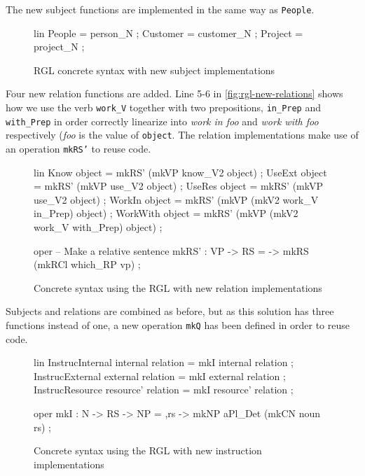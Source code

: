 The new subject functions are implemented in the same way as \texttt{People}.

\begin{figure}[H]
\begin{code}
lin
  People = person_N ;
  Customer = customer_N ;
  Project = project_N ;
\end{code}
\caption{RGL concrete syntax with new subject implementations\label{fig:rgl-new-subjects}}
\end{figure}

Four new relation functions are added. Line 5-6 in \autoref{fig:rgl-new-relations} shows how we use the verb \texttt{work\_V} together with two prepositions, \texttt{in\_Prep} and \texttt{with\_Prep} in order correctly linearize into \emph{work in foo} and \emph{work with foo} respectively (\emph{foo} is the value of \texttt{object}. The relation implementations make use of an operation \texttt{mkRS'} to reuse code.

\begin{figure}[H]
\begin{code}
lin
  Know object = mkRS' (mkVP know_V2 object) ;
  UseExt object = mkRS' (mkVP use_V2 object) ;
  UseRes object = mkRS' (mkVP use_V2 object) ;
  WorkIn object = mkRS' (mkVP (mkV2 work_V in_Prep) object) ;
  WorkWith object = mkRS' (mkVP (mkV2 work_V with_Prep) object) ;

oper
  -- Make a relative sentence
  mkRS' : VP -> RS = \vp -> mkRS (mkRCl which_RP vp) ;
\end{code}
\caption{Concrete syntax using the RGL with new relation implementations\label{fig:rgl-new-relations}}
\end{figure}

Subjects and relations are combined as before, but as this solution has three functions instead of one, a new operation \texttt{mkQ} has been defined in order to reuse code.

\begin{figure}[H]
\begin{code}
lin
  InstrucInternal internal relation = mkI internal relation ;
  InstrucExternal external relation = mkI external relation ;
  InstrucResource resource' relation = mkI resource' relation ;

oper
  mkI : N -> RS -> NP = \noun,rs -> mkNP aPl_Det 
                             (mkCN noun rs) ;
\end{code}
\caption{Concrete syntax using the RGL with new instruction implementations\label{fig:rgl-new-instructions}}
\end{figure}

